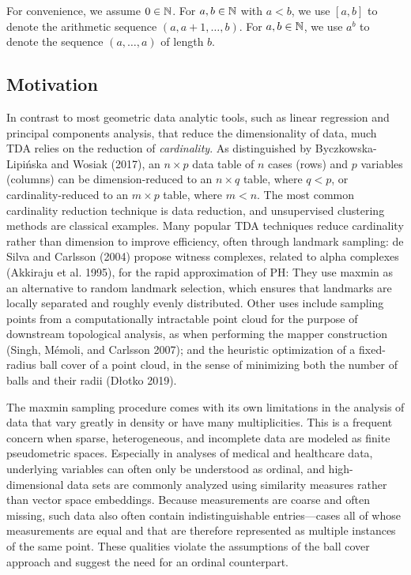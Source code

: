 \documentclass{article}
\begin{document}
For convenience, we assume \(0\in\mathbb{N}\). For \(a,b \in \mathbb{N}\) with
\(a<b\), we use \([a,b]\) to denote the arithmetic sequence
\((a,a+1,\ldots,b)\). For \(a,b \in \mathbb{N}\), we use \(a^b\) to denote the
sequence \((a,\ldots,a)\) of length \(b\).

\hypertarget{motivation}{%
\subsection{Motivation}\label{motivation}}

In contrast to most geometric data analytic tools, such as linear
regression and principal components analysis, that reduce the
dimensionality of data, much TDA relies on the reduction of
\emph{cardinality}. As distinguished by Byczkowska-Lipińska and Wosiak
(2017), an \(n\times p\) data table of \(n\) cases (rows) and \(p\)
variables (columns) can be dimension-reduced to an \(n\times q\) table,
where \(q<p\), or cardinality-reduced to an \(m\times p\) table, where
\(m<n\). The most common cardinality reduction technique is data
reduction, and unsupervised clustering methods are classical examples.
Many popular TDA techniques reduce cardinality rather than dimension to
improve efficiency, often through landmark sampling: de Silva and
Carlsson (2004) propose witness complexes, related to alpha complexes
(Akkiraju et al. 1995), for the rapid approximation of PH: They use
maxmin as an alternative to random landmark selection, which ensures
that landmarks are locally separated and roughly evenly distributed.
Other uses include sampling points from a computationally intractable
point cloud for the purpose of downstream topological analysis, as when
performing the mapper construction (Singh, Mémoli, and Carlsson 2007);
and the heuristic optimization of a fixed-radius ball cover of a point
cloud, in the sense of minimizing both the number of balls and their
radii (Dłotko 2019).

The maxmin sampling procedure comes with its own limitations in the
analysis of data that vary greatly in density or have many
multiplicities. This is a frequent concern when sparse, heterogeneous,
and incomplete data are modeled as finite pseudometric spaces.
Especially in analyses of medical and healthcare data, underlying
variables can often only be understood as ordinal, and high-dimensional
data sets are commonly analyzed using similarity measures rather than
vector space embeddings. Because measurements are coarse and often
missing, such data also often contain indistinguishable entries---cases
all of whose measurements are equal and that are therefore represented
as multiple instances of the same point. These qualities violate the
assumptions of the ball cover approach and suggest the need for an
ordinal counterpart.
\end{document}
